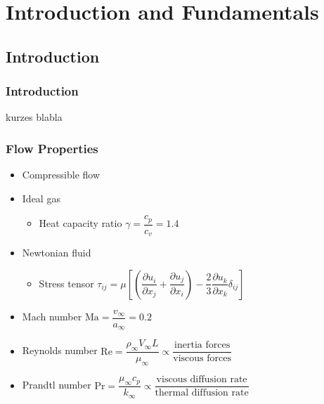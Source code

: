 \section{Introduction and Fundamentals}
\frame{\tableofcontents[currentsection]}
	\subsection{Introduction}
	\begin{frame}
		\frametitle{Introduction}
		kurzes blabla
	\end{frame}
	\begin{frame}
		\frametitle{Flow Properties}
		\begin{itemize}
			\item Compressible flow
			\item Ideal gas 
			\begin{itemize}
				\item Heat capacity ratio $\gamma = \dfrac{c_p}{c_v} = 1.4$
			\end{itemize}
			\item Newtonian fluid
			\begin{itemize}
				\item Stress tensor $\tau_{ij} = \mu \left[\left(\dfrac{\partial u_i}{\partial x_j} + \dfrac{\partial u_j}{\partial x_i}\right)- \dfrac{2}{3}\dfrac{\partial u_k}{\partial x_k} \delta_{ij}\right]$
			\end{itemize}
			\item Mach number $\text{Ma} = \dfrac{v_\infty}{a_\infty} = 0.2$
			\item Reynolds number $\text{Re} = \dfrac{\rho_\infty V_\infty L}{\mu_\infty} \propto \dfrac{\text{inertia forces}}{\text{viscous forces}}$
			\item Prandtl number $\text{Pr} = \dfrac{ \mu_\infty c_p}{k_\infty} \propto \dfrac{\text{viscous diffusion rate}}{\text{thermal diffusion rate}}$
		\end{itemize}
	\end{frame}
